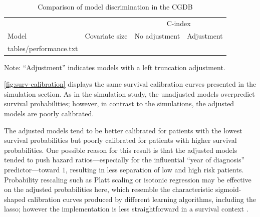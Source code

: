 \documentclass[11pt,final,fleqn]{article}\usepackage[]{graphicx}\usepackage[]{color}
\makeatletter
\theoremstyle{plain}
\newcommand*\ExpandableInput[1]{\@@input#1 }
\makeatother
\begin{document}
\begin{table}[!ht]
\begin{center}
\begin{threeparttable}
\caption{Comparison of model discrimination in the CGDB} \label{tbl:model-discrimination}
\begin{tabularx}{\textwidth}{@{\extracolsep{\fill}}llrr}
\hline
\multicolumn{2}{l}{} & \multicolumn{2}{c}{C-index}  \\
\cmidrule(r){3-4}  
\multicolumn{1}{l}{Model} & \multicolumn{1}{l}{Covariate size} & \multicolumn{1}{l}{No adjustment} & \multicolumn{1}{l}{Adjustment}  \\
\hline
\ExpandableInput{tables/performance.txt}
\hline
\end{tabularx}
\scriptsize Note: ``Adjustment'' indicates models with a left truncation adjustment.
\end{threeparttable}
\end{center}
\end{table}

\autoref{fig:surv-calibration} displays the same survival calibration curves presented in the simulation section. As in the simulation study, the unadjusted models overpredict survival probabilities; however, in contrast to the simulations, the adjusted models are poorly calibrated. 

The adjusted models tend to be better calibrated for patients with the lowest survival probabilities but poorly calibrated for patients with higher survival probabilities. One possible reason for this result is that the adjusted models tended to push hazard ratios---especially for the influential ``year of diagnosis'' predictor---toward $1$, resulting in less separation of low and high risk patients. Probability rescaling such as Platt scaling or isotonic regression may be effective on the adjusted probabilities here, which resemble the characteristic sigmoid-shaped calibration curves produced by different learning algorithms, including the lasso; however the implementation is less straightforward in a survival context \cite{goldstein2021xcal}.
\end{document}
